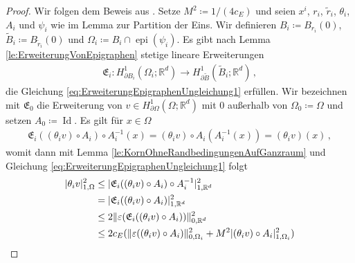 \documentclass{scrartcl}
\def\R{\mathbb{R}}
\def\e{\varepsilon}
\newcommand{\tir}{\tilde{r}}
\newcommand{\tiB}{\tilde{B}}
\newcommand{\erw}{\mathfrak{E}}			%
\DeclareMathOperator{\Id}{Id}             %
\DeclareMathOperator{\epi}{epi}			%
\DeclarePairedDelimiter{\abs}{\lvert}{\rvert}
\DeclarePairedDelimiter{\norm}{\lVert}{\rVert}
\begin{document}
\begin{proof}
	Wir folgen dem Beweis aus \cite[S.242]{Nit-1981}. Setze $M^2\coloneqq1/(4c_{E})$ und seien $x^{i}$, $r_i$, $\tir_i$, $\theta_i$, $A_i$ und $\psi_i$ wie im Lemma zur Partition der Eins. Wir definieren $B_i\coloneqq B_{r_i}(0)$, $\tiB_i\coloneqq B_{\tir_i}(0)$ und $\Omega_i\coloneqq B_i\cap\epi(\psi_i)$.
	Es gibt nach Lemma \ref{le:ErweiterungVonEpigraphen} stetige lineare Erweiterungen
	\begin{align*}
		\erw_i\colon H^1_{\partial B_i}(\Omega_i;\R^d)\to H^1_{\partial\tiB}(\tiB_i;\R^d)\,,
	\end{align*}
	die Gleichung \eqref{eq:ErweiterungEpigraphenUngleichung1} erfüllen. Wir bezeichnen mit $\erw_0$ die Erweiterung von $v\in H^1_{\partial\Omega}(\Omega;\R^d)$ mit $0$ außerhalb von $\Omega_0\coloneqq\Omega$ und setzen $A_0\coloneqq\Id$. Es gilt für $x\in\Omega$
	\begin{align*}
		\erw_i((\theta_iv)\circ A_i)\circ A_i^{-1}(x)
		= (\theta_iv)\circ A_i(A_i^{-1}(x))
		= (\theta_iv)(x)\,,
	\end{align*}
	womit dann mit Lemma \ref{le:KornOhneRandbedingungenAufGanzraum} und Gleichung \eqref{eq:ErweiterungEpigraphenUngleichung1} folgt
	\begin{align*}
		\abs{\theta_iv}_{1,\Omega}^2
		&\leq \abs{\erw_i((\theta_iv)\circ A_i)\circ A_i^{-1}}_{1,\R^d}^2 \\
		&= \abs{\erw_i((\theta_iv)\circ A_i)}_{1,\R^d}^2 \\
		&\leq 2\norm{\e(\erw_i((\theta_iv)\circ A_i))}_{0,\R^d}^2 \\
		&\leq 2c_{E}(\norm{\e((\theta_iv)\circ A_i)}_{0,\Omega_i}^2+M^2\abs{(\theta_iv)\circ A_i}_{1,\Omega_i}^2) \\

\end{align*}
\end{proof}
\end{document}
